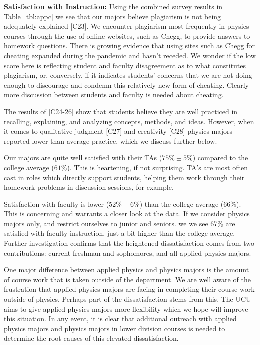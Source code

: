 \documentclass[12pt]{article}
\begin{document}
\noindent
{\bf Satisfaction with Instruction:} Using the combined survey results
in Table~\ref{tbl:appc} we see that our majors believe plagiarism is
not being adequately explained [C23].  We encounter plagiarism most
frequently in physics courses through the use of online websites, such
as Chegg, to provide answers to homework questions.  There is growing
evidence that using sites such as Chegg for cheating expanded during
the pandemic and hasn't receded.  We wonder if the low score here is
reflecting student and faculty disagreement as to what constitutes
plagiarism, or, conversely, if it indicates students' concerns that we
are not doing enough to discourage and condemn this relatively new
form of cheating.  Clearly more discussion between students and
faculty is needed about cheating.

The results of [C24-26] show that students believe they are well
practiced in recalling, explaining, and analyzing concepts, methods,
and ideas.  However, when it comes to qualitative judgment [C27] and
creativity [C28] physics majors reported lower than average practice,
which we discuss further below.

Our majors are quite well satisfied with their TAs ($75\% \pm 5\%$)
compared to the college average ($61\%$).  This is heartening, if not
surprising.  TA's are most often cast in roles which directly support
students, helping them work through their homework problems in
discussion sessions, for example.

Satisfaction with faculty is lower ($52\% \pm 6\%$) than the college
average ($66\%$).  This is concerning and warrants a closer look at
the data.  If we consider physics majors only, and restrict ourselves
to junior and seniors. we we see 67\% are satisfied with faculty
instruction, just a bit higher than the college average.  Further
investigation confirms that the heightened dissatisfaction comes from
two contributions: current freshman and sophomores, and all applied
physics majors.

One major difference between applied physics and physics majors is the
amount of course work that is taken outside of the department. We are
well aware of the frustration that applied physics majors are facing
in completing their course work outside of physics.  Perhaps part of
the dissatisfaction stems from this.  The UCU aims to give applied
physics majors more flexibility which we hope will improve this
situation.  In any event, it is clear that additional outreach with
applied physics majors and physics majors in lower division courses is
needed to determine the root causes of this elevated
dissatisfaction.\\[3pt]
\end{document}
